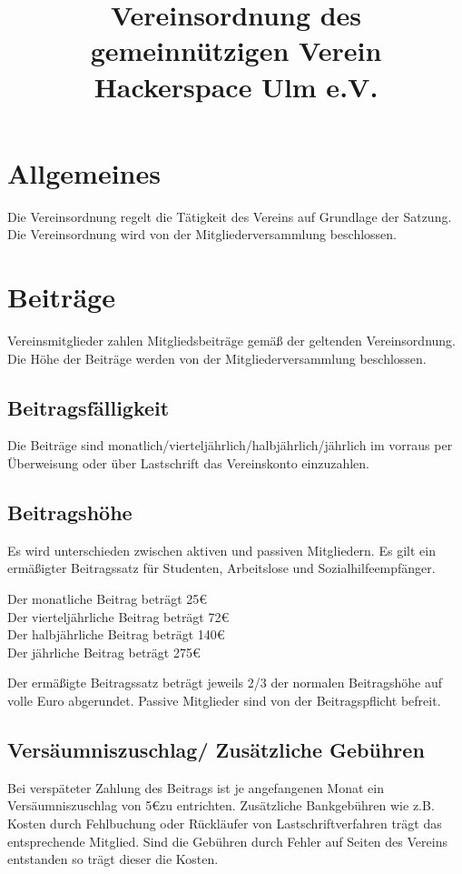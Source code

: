 \documentclass[a4paper, 12pt]{scrartcl}
\title{Vereinsordnung des gemeinnützigen Verein Hackerspace Ulm e.V. }
\author{}
\begin{document}
\maketitle
\sffamily

\section{Allgemeines}
Die Vereinsordnung regelt die Tätigkeit des Vereins auf Grundlage der Satzung. Die Vereinsordnung wird von der Mitgliederversammlung beschlossen. 

\section{Beiträge}
Vereinsmitglieder zahlen Mitgliedsbeiträge gemäß der geltenden Vereinsordnung. Die Höhe der Beiträge werden von der Mitgliederversammlung beschlossen. 
\subsection{Beitragsfälligkeit}
Die Beiträge sind monatlich/vierteljährlich/halbjährlich/jährlich im vorraus per Überweisung oder über Lastschrift das Vereinskonto einzuzahlen. 
\subsection{Beitragshöhe}
Es wird unterschieden zwischen aktiven und passiven Mitgliedern. Es gilt ein ermäßigter Beitragssatz für Studenten, Arbeitslose und Sozialhilfeempfänger. \\
\begin{addmargin}[1in]{0cm}
Der monatliche Beitrag beträgt 25\euro{}\\
Der vierteljährliche Beitrag beträgt 72\euro{}\\
Der halbjährliche Beitrag beträgt 140\euro{} \\
Der jährliche Beitrag beträgt 275\euro{}\\
\end{addmargin}
Der ermäßigte Beitragssatz beträgt jeweils 2/3 der normalen Beitragshöhe auf volle Euro abgerundet. Passive Mitglieder sind von der Beitragspflicht befreit. 

\subsection{Versäumniszuschlag/ Zusätzliche Gebühren}
Bei verspäteter Zahlung des Beitrags ist je angefangenen Monat ein Versäumniszuschlag von 5\euro zu entrichten. Zusätzliche Bankgebühren wie z.B. Kosten durch Fehlbuchung oder Rückläufer von Lastschriftverfahren trägt das entsprechende Mitglied. Sind die Gebühren durch Fehler auf Seiten des Vereins entstanden so trägt dieser die Kosten. 
\end{document}
